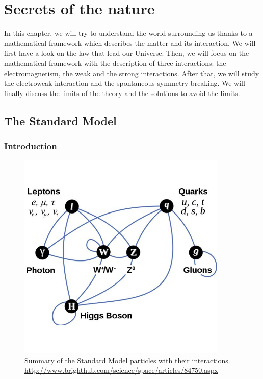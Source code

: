 \chapter{Secrets of the nature}
\label{chap:SM}


    In this chapter, we will try to understand the world surrounding us thanks to a mathematical framework which describes the matter and its interaction.
    We will first have a look on the law that lead our Universe. Then, we will focus on the mathematical framework with the description of three interactions: the electromagnetism, the weak and the strong interactions.
    After that, we will study the electroweak interaction and the spontaneous symmetry breaking. We will finally discuss the limits of the theory and the solutions to avoid the limits. 
 \minitoc
 \clearpage
  \section{The Standard Model}

    \subsection{Introduction}
     
    \begin{figure}[!h]
    \centering
      \includegraphics[width = 10cm]{Pictures/SM/elementaryParticles.jpg}
    \caption{Summary of the Standard Model particles with their interactions.\\ \url{http://www.brighthub.com/science/space/articles/84750.aspx}}
    \label{fig:partInterac}
    \end{figure}   
    
